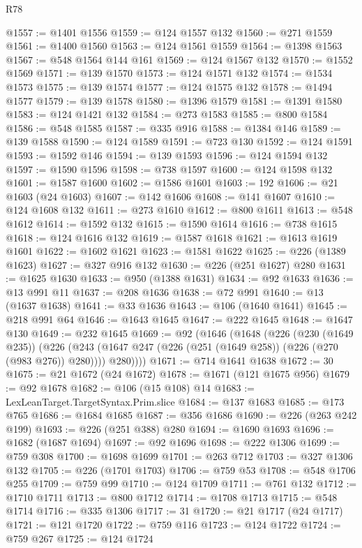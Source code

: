 \begin{lexlean}{R78}
\begin{coremodule}
@1557 := @1401 @1556
@1559 := @124 @1557 @132
@1560 := @271 @1559
@1561 := @1400 @1560
@1563 := @124 @1561 @1559
@1564 := @1398 @1563
@1567 := @548 @1564 @144 @161
@1569 := @124 @1567 @132
@1570 := @1552 @1569
@1571 := @139 @1570
@1573 := @124 @1571 @132
@1574 := @1534 @1573
@1575 := @139 @1574
@1577 := @124 @1575 @132
@1578 := @1494 @1577
@1579 := @139 @1578
@1580 := @1396 @1579
@1581 := @1391 @1580
@1583 := @124 @1421 @132
@1584 := @273 @1583
@1585 := @800 @1584
@1586 := @548 @1585
@1587 := @335 @916
@1588 := @1384 @146
@1589 := @139 @1588
@1590 := @124 @1589
@1591 := @723 @130
@1592 := @124 @1591
@1593 := @1592 @146
@1594 := @139 @1593
@1596 := @124 @1594 @132
@1597 := @1590 @1596
@1598 := @738 @1597
@1600 := @124 @1598 @132
@1601 := @1587 @1600
@1602 := @1586 @1601
@1603 := 192
@1606 := @21 @1603 (@24 @1603)
@1607 := @142 @1606
@1608 := @141 @1607
@1610 := @124 @1608 @132
@1611 := @273 @1610
@1612 := @800 @1611
@1613 := @548 @1612
@1614 := @1592 @132
@1615 := @1590 @1614
@1616 := @738 @1615
@1618 := @124 @1616 @132
@1619 := @1587 @1618
@1621 := @1613 @1619 @1601
@1622 := @1602 @1621
@1623 := @1581 @1622
@1625 := @226 (@1389 @1623)
@1627 := @327 @916 @132
@1630 := @226 (@251 @1627) @280
@1631 := @1625 @1630
@1633 := @950 (@1388 @1631)
@1634 := @92 @1633
@1636 := @13 @991 @11
@1637 := @208 @1636
@1638 := @72 @991
@1640 := @13 (@1637 @1638)
@1641 := @33 @1636
@1643 := @106 (@1640 @1641)
@1645 := @218 @991 @64
@1646 := @1643 @1645
@1647 := @222 @1645
@1648 := @1647 @130
@1649 := @232 @1645
@1669 := @92
    (@1646
      (@1648
        (@226
          (@230 (@1649 @235))
          (@226
            (@243 (@1647 @247 (@226 (@251 (@1649 @258)) (@226 (@270 (@983 @276)) @280))))
            @280))))
@1671 := @714 @1641 @1638
@1672 := 30
@1675 := @21 @1672 (@24 @1672)
@1678 := @1671 (@121 @1675 @956)
@1679 := @92 @1678
@1682 := @106 (@15 @108) @14
@1683 := LexLeanTarget.TargetSyntax.Prim.slice
@1684 := @137 @1683
@1685 := @173 @765
@1686 := @1684 @1685
@1687 := @356 @1686
@1690 := @226 (@263 @242 @199)
@1693 := @226 (@251 @388) @280
@1694 := @1690 @1693
@1696 := @1682 (@1687 @1694)
@1697 := @92 @1696
@1698 := @222 @1306
@1699 := @759 @308
@1700 := @1698 @1699
@1701 := @263 @712
@1703 := @327 @1306 @132
@1705 := @226 (@1701 @1703)
@1706 := @759 @53
@1708 := @548 @1706 @255
@1709 := @759 @99
@1710 := @124 @1709
@1711 := @761 @132
@1712 := @1710 @1711
@1713 := @800 @1712
@1714 := @1708 @1713
@1715 := @548 @1714
@1716 := @335 @1306
@1717 := 31
@1720 := @21 @1717 (@24 @1717)
@1721 := @121 @1720
@1722 := @759 @116
@1723 := @124 @1722
@1724 := @759 @267
@1725 := @124 @1724

\end{coremodule}
\end{lexlean}
